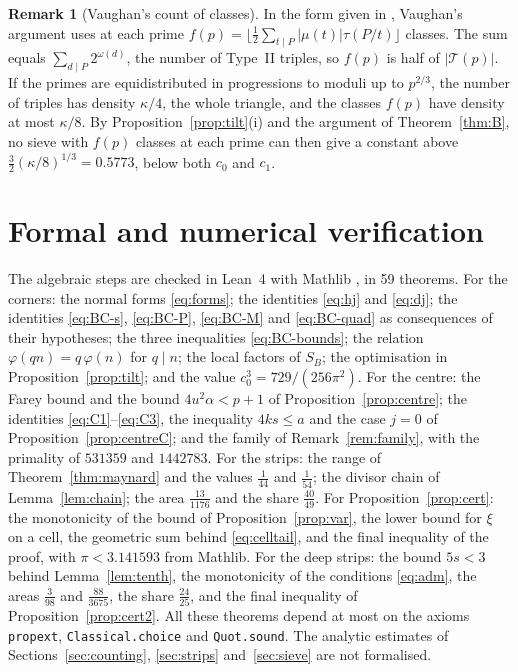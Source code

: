 \documentclass[aps,prd,twocolumn,superscriptaddress,nofootinbib,longbibliography,floatfix,showkeys,nobalancelastpage,amsmath,amssymb,10pt]{revtex4-2}
\theoremstyle{plain}
\theoremstyle{definition}
\newtheorem{remark}[theorem]{Remark}
\theoremstyle{plain}
\newcommand{\Tp}{\mathcal{T}}
\begin{document}
\begin{remark}[Vaughan's count of classes]
In the form given in \cite[Section~4]{PW}, Vaughan's argument uses at each prime $f(p)=\lfloor\frac12\sum_{t\mid P}|\mu(t)|\tau(P/t)\rfloor$ classes. The sum equals $\sum_{d\mid P}2^{\omega(d)}$, the number of Type~II triples, so $f(p)$ is half of $|\Tp(p)|$. If the primes are equidistributed in progressions to moduli up to $p^{2/3}$, the number of triples has density $\kappa/4$, the whole triangle, and the classes $f(p)$ have density at most $\kappa/8$. By Proposition~\ref{prop:tilt}(i) and the argument of Theorem~\ref{thm:B}, no sieve with $f(p)$ classes at each prime can then give a constant above $\frac32(\kappa/8)^{1/3}=0.5773$, below both $c_0$ and $c_1$.
\end{remark}

\section{Formal and numerical verification}\label{sec:verification}

The algebraic steps are checked in Lean~4 \cite{Lean} with Mathlib \cite{Mathlib}, in 59 theorems. For the corners: the normal forms \eqref{eq:forms}; the identities \eqref{eq:hj} and \eqref{eq:dj}; the identities \eqref{eq:BC-s}, \eqref{eq:BC-P}, \eqref{eq:BC-M} and \eqref{eq:BC-quad} as consequences of their hypotheses; the three inequalities \eqref{eq:BC-bounds}; the relation $\varphi(qn)=q\,\varphi(n)$ for $q\mid n$; the local factors of $S_B$; the optimisation in Proposition~\ref{prop:tilt}; and the value $c_0^3=729/(256\pi^2)$. For the centre: the Farey bound and the bound $4u^2\alpha<p+1$ of Proposition~\ref{prop:centre}; the identities \eqref{eq:C1}--\eqref{eq:C3}, the inequality $4ks\le a$ and the case $j=0$ of Proposition~\ref{prop:centreC}; and the family of Remark~\ref{rem:family}, with the primality of $531359$ and $1442783$. For the strips: the range of Theorem~\ref{thm:maynard} and the values $\frac1{44}$ and $\frac1{54}$; the divisor chain of Lemma~\ref{lem:chain}; the area $\frac{13}{1176}$ and the share $\frac{40}{49}$. For Proposition~\ref{prop:cert}: the monotonicity of the bound of Proposition~\ref{prop:var}, the lower bound for $\xi$ on a cell, the geometric sum behind \eqref{eq:celltail}, and the final inequality of the proof, with $\pi<3.141593$ from Mathlib. For the deep strips: the bound $5s<3$ behind Lemma~\ref{lem:tenth}, the monotonicity of the conditions \eqref{eq:adm}, the areas $\frac3{98}$ and $\frac{88}{3675}$, the share $\frac{24}{25}$, and the final inequality of Proposition~\ref{prop:cert2}. All these theorems depend at most on the axioms \texttt{propext}, \texttt{Classical.choice} and \texttt{Quot.sound}. The analytic estimates of Sections~\ref{sec:counting}, \ref{sec:strips} and~\ref{sec:sieve} are not formalised.
\end{document}

